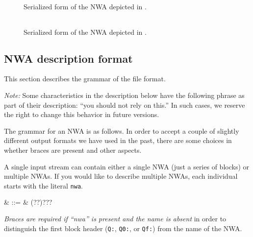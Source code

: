 \begin{figure}
  \centering
  \begin{tabular}{p{2.5in}}
    
  \end{tabular}
  \caption{Serialized form of the NWA depicted in .}
  \label{Fi:nwa-simple}
\end{figure}

\begin{figure}
  \centering
  \begin{tabular}{p{6in}}
    
  \end{tabular}
  \caption{Serialized form of the NWA depicted in .}
  \label{Fi:nwa-mattf}
\end{figure}

\subsection{NWA description format}
\label{Se:nwa-grammar}

This section describes the grammar of the file format.

\emph{Note:} Some characteristics in the description below have the
following phrase as part of their description: ``you should not rely on
this.'' In such cases, we reserve the right to change this behavior in
future versions. %



The grammar for an NWA is as follows. In order to accept a couple of
slightly different output formats we have used in the past, there are
some choices in whether braces are present and other aspects.


A single input stream can contain either a single NWA (just a series
of blocks) or multiple NWAs. If you would like to describe multiple
NWAs, each individual starts with the literal \texttt{nwa}.


\begin{grammar}
   & ::= & \left(\cfgsp{}?\cfgsp\term{:}?\right)?\cfgsp\term{\{}?\cfgsp{}\cfgsp\term{\}}?
\end{grammar}

\emph{Braces are required if ``nwa'' is present and the name is absent}
 in order to
 distinguish the first block header (\texttt{Q:}, \texttt{Q0:},
 or \texttt{Qf:}) from the name of the NWA.

